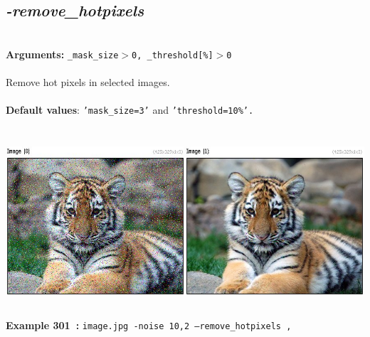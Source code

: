 \documentclass[a4paper,11pt,twoside]{book}
\begin{document}
\subsection{\emph{-remove\_hotpixels} }\vspace*{-0.5em}
~\\\textbf{Arguments: } 
{\small \texttt{\_mask\_size$>$0, \_threshold[\%]$>$0}}\\~\\
Remove hot pixels in selected images.
~\\~\\\textbf{Default values}: {\small \texttt{'mask\_size=3'} and \texttt{'threshold=10\%'.}}
\begin{center}\includegraphics[keepaspectratio=true,height=7cm,width=\textwidth]{img/gmic_def301.jpg}\\
{\footnotesize \textbf{Example 301~:} \texttt{image.jpg -noise 10,2 --remove\_hotpixels ,}}
\end{center}
\end{document}

